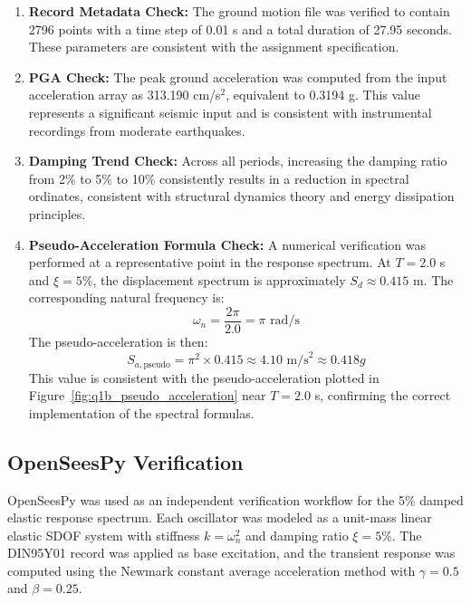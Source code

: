 ﻿\documentclass[12pt]{article}
\begin{document}
\begin{enumerate}
    \item \textbf{Record Metadata Check:} The ground motion file was verified to contain 2796 points with a time step of 0.01 s and a total duration of 27.95 seconds. These parameters are consistent with the assignment specification.
    
    \item \textbf{PGA Check:} The peak ground acceleration was computed from the input acceleration array as 313.190 cm/s\(^2\), equivalent to 0.3194 g. This value represents a significant seismic input and is consistent with instrumental recordings from moderate earthquakes.
    
    \item \textbf{Damping Trend Check:} Across all periods, increasing the damping ratio from 2\% to 5\% to 10\% consistently results in a reduction in spectral ordinates, consistent with structural dynamics theory and energy dissipation principles.
    
    \item \textbf{Pseudo-Acceleration Formula Check:} A numerical verification was performed at a representative point in the response spectrum. At \(T = 2.0\) s and \(\xi = 5\%\), the displacement spectrum is approximately \(S_d \approx 0.415\) m. The corresponding natural frequency is:
    \begin{equation}
    \omega_n = \frac{2\pi}{2.0} = \pi \text{ rad/s}
    \end{equation}
    The pseudo-acceleration is then:
    \begin{equation}
    S_{a,\text{pseudo}} = \pi^2 \times 0.415 \approx 4.10 \text{ m/s}^2 \approx 0.418 g
    \end{equation}
    This value is consistent with the pseudo-acceleration plotted in Figure~\ref{fig:q1b_pseudo_acceleration} near \(T = 2.0\) s, confirming the correct implementation of the spectral formulas.
\end{enumerate}

\subsection{OpenSeesPy Verification}

OpenSeesPy was used as an independent verification workflow for the 5\% damped elastic response spectrum. Each oscillator was modeled as a unit-mass linear elastic SDOF system with stiffness $k=\omega_n^2$ and damping ratio $\xi=5\%$. The DIN95Y01 record was applied as base excitation, and the transient response was computed using the Newmark constant average acceleration method with $\gamma=0.5$ and $\beta=0.25$.
\end{document}
